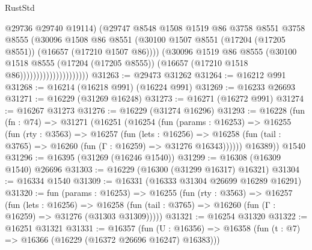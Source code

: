 \begin{lexlean}{RustStd}
\begin{coremodule}
                                      @29736
                                      @29740
                                      @19114)
                                    (@29747
                                      @8548
                                      @1508
                                      @1519
                                      @86
                                      @3758
                                      @8551
                                      @3758
                                      @8555
                                      (@30096
                                        @1508
                                        @86
                                        @8551
                                        (@30100
                                          @1507
                                          @8551
                                          (@17204 (@17205 @8551))
                                          (@16657 (@17210 @1507 @86))))
                                      (@30096
                                        @1519
                                        @86
                                        @8555
                                        (@30100
                                          @1518
                                          @8555
                                          (@17204 (@17205 @8555))
                                          (@16657 (@17210 @1518 @86)))))))))))))))))))))
@31263 := @29473 @31262
@31264 := @16212 @991
@31268 := @16214 (@16218 @991) (@16224 @991)
@31269 := @16233 @26693
@31271 := @16229 (@31269 @16248)
@31273 := @16271 (@16272 @991)
@31274 := @16267 @31273
@31276 := @16229 (@31274 @16296)
@31293 := @16228
    (fun (fn : @74) =>
    @31271
      (@16251
        (@16254
          (fun (params : @16253) =>
          @16255
            (fun (rty : @3563) =>
            @16257
              (fun (lets : @16256) =>
              @16258 (fun (tail : @3765) => @16260 (fun (Γ : @16259) => @31276 @16343))))))
        @16389))
    @1540
@31296 := @16395 (@31269 (@16246 @1540))
@31299 := @16308 (@16309 @1540) @26696
@31303 := @16229 (@16300 (@31299 @16317) @16321)
@31304 := @16334 @1540
@31309 := @16331 (@16333 @31304 @26699 @16289 @16291)
@31320 := fun (params : @16253) =>
  @16255
    (fun (rty : @3563) =>
    @16257
      (fun (lets : @16256) =>
      @16258 (fun (tail : @3765) => @16260 (fun (Γ : @16259) => @31276 (@31303 @31309)))))
@31321 := @16254 @31320
@31322 := @16251 @31321
@31331 := @16357
    (fun (U : @16356) => @16358 (fun (t : @7) => @16366 (@16229 (@16372 @26696 @16247) @16383)))

\end{coremodule}
\end{lexlean}
